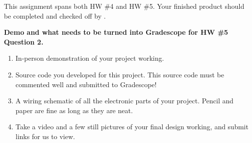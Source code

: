 \documentclass[11pt]{article}
\begin{document}
This assignment spans both HW \#4 and HW \#5. Your finished product should be completed and checked off by .

\textbf{Demo and what needs to be turned into Gradescope for HW \#5 Question 2.}
%
\begin{enumerate}
    \item In-person demonstration of your project working.
    \item Source code you developed for this project. This source code must be commented well and submitted to Gradescope!
    \item A wiring schematic of all the electronic parts of your project. Pencil and paper are fine as long as they are neat.
    \item Take a video and a few still pictures of your final design working, and submit links for us to view.
\end{enumerate}
%
%
\MakeFooter
%
\end{document}
